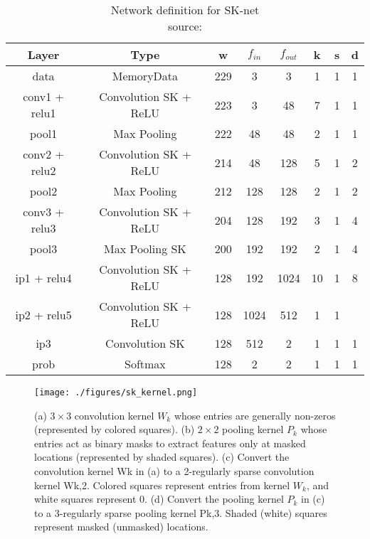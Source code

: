 \begin{table}
\begin{center}
  \begin{tabular}{ | c | c | c | c | c | c | c | c | }
    \hline
    Layer  &  Type  & w & $f_{in}$ & $f_{out}$ & k & s & d  \\ 
    \hline
   data & MemoryData & 229 & 3 & 3 & 1 & 1 & 1 \\ 
   \hline 
   conv1 + relu1 & Convolution SK  + ReLU & 223 & 3 & 48 & 7 & 1  & 1 \\  
    \hline
   pool1 & Max Pooling & 222 & 48 & 48 & 2 & 1 & 1 \\ 
   \hline
   conv2 + relu2 & Convolution SK + ReLU & 214 & 48 & 128 & 5 & 1 & 2 \\
   \hline
   pool2 & Max Pooling & 212 & 128 & 128 & 2 & 1 & 2 \\ 
   \hline
   conv3 + relu3 & Convolution SK + ReLU & 204 & 128 & 192 & 3 & 1 & 4 \\
    \hline
   pool3 & Max Pooling SK & 200 & 192 & 192 & 2 & 1 & 4 \\ 
   \hline
   ip1 + relu4 & Convolution SK  + ReLU & 128 & 192 & 1024 & 10 & 1 & 8 \\
    \hline
   ip2 + relu5 & Convolution SK  + ReLU & 128 & 1024 & 512 & 1 & 1 & \\
    \hline
   ip3  & Convolution SK  & 128 & 512 & 2 & 1 & 1 & 1 \\ 
   \hline
   prob & Softmax & 128 & 2 & 2 & 1 & 1 & 1 \\ 
    \hline
  \end{tabular}
  \end{center}
  \caption{Network definition for SK-net \\ source:\cite{DBLP:journals/corr/Tschopp15}}
  \label{table:def-sk-net}
  \end{table}


\begin{figure}[ht!]

         \centering
 
        \texttt{[image: ./figures/sk\_kernel.png]}
        \caption{(a) $3 \times 3$ convolution kernel $W_k$ whose entries are generally non-zeros (represented by colored squares). (b) $2 \times 2$ pooling kernel $P_k$ whose entries act as binary masks to extract features
only at masked locations (represented by shaded squares). (c) Convert the convolution kernel Wk in (a) to a 2-regularly sparse convolution kernel Wk,2. Colored squares represent entries from kernel $W_k$, and white squares represent 0. (d) Convert the pooling kernel $P_k$ in (c) to a 3-regularly sparse pooling kernel Pk,3. Shaded (white) squares represent masked (unmasked) locations.}
\end{figure}

